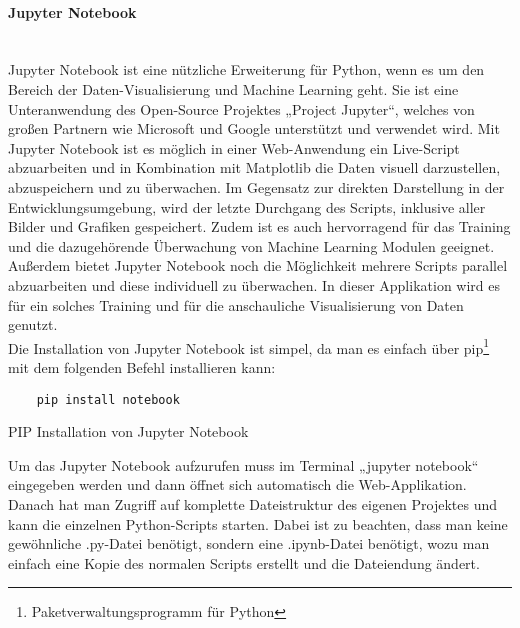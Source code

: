 \paragraph{Jupyter Notebook}\mbox{}\\
Jupyter Notebook ist eine nützliche Erweiterung für Python, wenn es um den Bereich der Daten-Visualisierung und Machine Learning geht. 
Sie ist eine Unteranwendung des Open-Source Projektes „Project Jupyter“, welches von großen Partnern wie Microsoft und Google unterstützt 
und verwendet wird. Mit Jupyter Notebook ist es möglich in einer Web-Anwendung ein Live-Script abzuarbeiten und in Kombination mit Matplotlib 
die Daten visuell darzustellen, abzuspeichern und zu überwachen. Im Gegensatz zur direkten Darstellung in der Entwicklungsumgebung, wird 
der letzte Durchgang des Scripts, inklusive aller Bilder und Grafiken gespeichert. Zudem ist es auch hervorragend für das Training und 
die dazugehörende Überwachung von Machine Learning Modulen geeignet. Außerdem bietet Jupyter Notebook noch die Möglichkeit mehrere Scripts 
parallel abzuarbeiten und diese individuell zu überwachen. In dieser Applikation wird es für ein solches Training und für die anschauliche 
Visualisierung von Daten genutzt.\\

Die Installation von Jupyter Notebook ist simpel, da man es einfach über pip\footnote{Paketverwaltungsprogramm für Python} mit dem folgenden Befehl installieren kann:

\begin{listing}[H]
    \begin{verbatim}
    pip install notebook
    \end{verbatim}
    \caption{PIP Installation von Jupyter Notebook}
\end{listing}

Um das Jupyter Notebook aufzurufen muss im Terminal „jupyter notebook“ eingegeben werden und dann öffnet sich automatisch die Web-Applikation. 
Danach hat man Zugriff auf komplette Dateistruktur des eigenen Projektes und kann die einzelnen Python-Scripts starten. Dabei ist zu beachten, 
dass man keine gewöhnliche .py-Datei benötigt, sondern eine .ipynb-Datei benötigt, wozu man einfach eine Kopie des normalen Scripts erstellt und die Dateiendung ändert.

